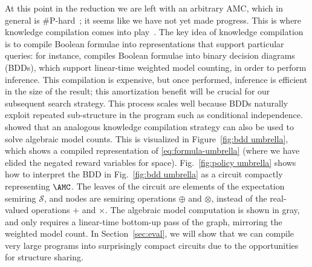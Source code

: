 
At this point in the reduction we are left with an arbitrary AMC, which in general is \#P-hard~\cite{kimmig2017algebraic}; it seems like we have not yet
made progress. This is where knowledge compilation comes into
play~\cite{darwiche2002knowledge,chavira2008probabilistic, sang2005performing}.
The key idea of knowledge compilation is to compile Boolean formulae into representations
that support particular queries: for instance, \dice{} compiles Boolean formulae into
binary decision diagrams (BDDs), which support linear-time weighted model counting,
in order to perform inference.
This compilation is expensive, but once performed, inference is efficient in the
size of the result; this amortization benefit will be crucial for our subsequent search strategy.
This process scales well because
BDDs naturally exploit repeated
sub-structure in the program such as conditional independence.
\citet{kimmig2017algebraic} showed that an analogous knowledge compilation strategy
can also be used to solve algebraic model counts.
This is visualized in Figure~\ref{fig:bdd umbrella}, which shows a
compiled representation of \cref{eq:formula-umbrella} (where we
have elided the negated reward variables for space).
Fig.~\ref{fig:policy umbrella} shows how to interpret the BDD in
Fig.~\ref{fig:bdd umbrella} as a circuit compactly representing $\AMC$.
The leaves of the circuit are elements of the
expectation semiring $\mathcal S$, and nodes are semiring operations $\oplus$
and $\otimes$, instead of the real-valued operations $+$ and $\times$.
The algebraic model
computation is shown in gray, and only requires a linear-time
bottom-up pass of the graph, mirroring the weighted model count.
In Section~\ref{sec:eval}, we will show that we
can compile very large \dappl{} programs into surprisingly compact circuits
due to the opportunities for structure sharing.


